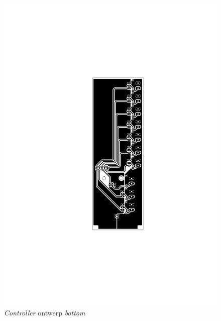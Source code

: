 \begin{figure}
    \includegraphics[scale=0.75]{figures/controller_bottom.pdf}
    \caption{\emph{Controller} ontwerp \emph{bottom}}
\end{figure}
